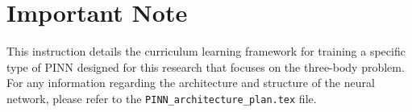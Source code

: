 \section{Important Note}
This instruction details the curriculum learning framework for training a specific type of PINN
designed for this research that focuses on the three-body problem.
For any information regarding the architecture and structure of the neural network,
please refer to the \texttt{PINN\_architecture\_plan.tex} file.